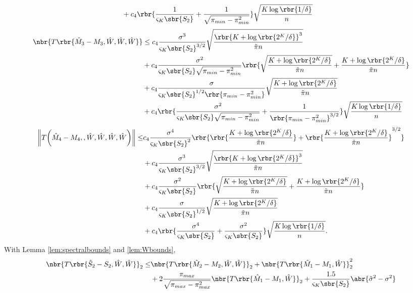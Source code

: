 \documentclass[twoside,11pt]{article}
\begin{document}
{\begin{align}
  &+ c_4\rbr{\frac{1}{\varsigma_K\sbr{S_2}}+ \frac{1}{ \sqrt{\pi_{min}-\pi_{min}^2}}} \sqrt{\frac{K\log \rbr{1/\delta}}{n}}
\end{align}
\begin{align}
 \nbr{T\rbr{\hat{M}_3-M_3,\hat{W},\hat{W},\hat{W}}}& \leq c_4 \frac{\sigma^3}{\varsigma_K\sbr{S_2}^{3/2}} \sqrt{\frac{\rbr{K+\log \rbr{2^K/\delta}}^3}{\tilde{\pi}n}}\nonumber\\
 &+c_4 \frac{\sigma^2}{\varsigma_K\sbr{S_2}\sqrt{\pi_{min}-\pi_{min}^2}}\rbr{ \sqrt{\frac{K+\log \rbr{2^K/\delta}}{\tilde{\pi}n}}+\frac{K+\log \rbr{2^K/\delta}}{\tilde{\pi}n} }\nonumber\\
  &+ c_4 \frac{\sigma}{ \varsigma_K\sbr{S_2}^{1/2}\rbr{\pi_{min}-\pi_{min}^2}}  \sqrt{\frac{K+\log \rbr{2^K/\delta}}{\tilde{\pi}n}}\nonumber \\
  &+ c_4\rbr{\frac{\sigma^2}{\varsigma_K\sbr{S_2}\sqrt{\pi_{min}-\pi_{min}^2}}+ \frac{1}{ \rbr{\pi_{min}-\pi_{min}^2}^{3/2}}} \sqrt{\frac{K\log \rbr{1/\delta}}{n}}
\end{align}
\begin{align}
 \bigg\lVert T\bigg(\hat{M}_4-M_4,,\hat{W},\hat{W},\hat{W},\hat{W} \bigg) \bigg\rVert \leq& c_4 \frac{\sigma^4}{\varsigma_K\sbr{S_2}^2} \rbr{ \rbr{\frac{K+\log \rbr{2^K/\delta}}{\tilde{\pi}n}}+\rbr{\frac{K+\log \rbr{2^K/\delta}}{\tilde{\pi}n}}^{3/2}}\nonumber\\
  &+c_4 \frac{\sigma^3}{\varsigma_K\sbr{S_2}^{3/2}} \sqrt{\frac{\rbr{K+\log \rbr{2^K/\delta}}^3}{\tilde{\pi}n}}\nonumber\\
 &+c_4 \frac{\sigma^2}{\varsigma_K\sbr{S_2}}\rbr{ \sqrt{\frac{K+\log \rbr{2^K/\delta}}{\tilde{\pi}n}}+\frac{K+\log \rbr{2^K/\delta}}{\tilde{\pi}n} }\nonumber\\
  &+ c_4 \frac{\sigma}{ \varsigma_K\sbr{S_2}^{1/2}}   \sqrt{\frac{K+\log \rbr{2^K/\delta}}{\tilde{\pi}n}} \nonumber\\
  &+ c_4\rbr{\frac{\sigma^4}{\varsigma_K\sbr{S_2}}+\frac{\sigma^2}{\varsigma_K\sbr{S_2}}} \sqrt{\frac{K\log \rbr{1/\delta}}{n}}.
\end{align}
With Lemma \ref{lem:spectralbounds} and \ref{lem:Wbounds}, 
\begin{align}
 \nbr{T\rbr{\hat{S}_2- S_2,\hat{W},\hat{W}}}_2 \leq& \nbr{T\rbr{\hat{M}_2 - M_2,\hat{W},\hat{W}}}_2 + \nbr{T\rbr{ \hat{M}_1 - M_1 ,\hat{W}} }_2^2\nonumber\\
    &+ 2 \frac{\pi_{max}}{\sqrt{\pi_{max}-\pi_{max}^2 }}\nbr{T\rbr{ \hat{M}_1 - M_1,\hat{W}} }_2+ \frac{1.5}{\varsigma_K\sbr{S_2}} \abr{\hat{\sigma}^2 - \sigma^2}

\end{align}}
\end{document}
